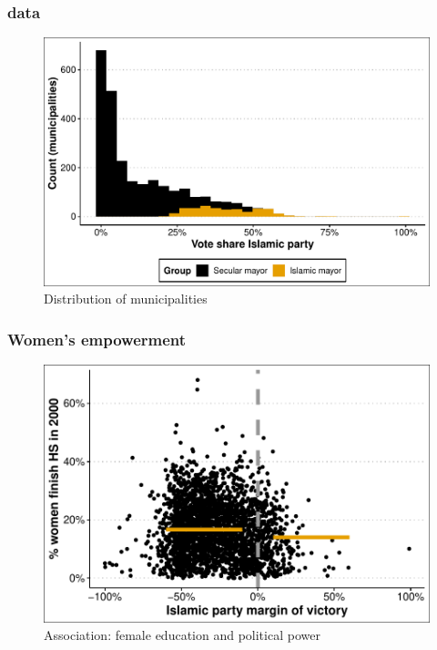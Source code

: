 \documentclass[12pt,english,dvipsnames,aspectratio=169,handout]{beamer}\usepackage[]{graphicx}\usepackage[]{xcolor}
\begin{document}
\begin{frame}
\frametitle{ data}






\begin{figure}
\centering
\includegraphics[scale=0.6]{../04-figures/07/02.pdf}
\caption{Distribution of municipalities}
\end{figure}

\end{frame}



\begin{frame}
\frametitle{Women's empowerment}



\begin{figure}
\centering
\includegraphics[scale=0.6]{../04-figures/07/03.pdf}
\caption{Association: female education and political power}
\end{figure}

\end{frame}
\end{document}
